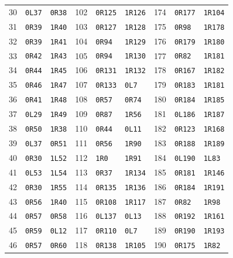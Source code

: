 \begin{longtable}{@{}rll@{\hspace{1.4em}}rll@{\hspace{1.4em}}rll@{}}
30 & \texttt{0L37} & \texttt{0R38} & 102 & \texttt{0R125} & \texttt{1R126} & 174 & \texttt{0R177} & \texttt{1R104} \\
31 & \texttt{0R39} & \texttt{1R40} & 103 & \texttt{0R127} & \texttt{1R128} & 175 & \texttt{0R98} & \texttt{1R178} \\
32 & \texttt{0R39} & \texttt{1R41} & 104 & \texttt{0R94} & \texttt{1R129} & 176 & \texttt{0R179} & \texttt{1R180} \\
33 & \texttt{0R42} & \texttt{1R43} & 105 & \texttt{0R94} & \texttt{1R130} & 177 & \texttt{0R82} & \texttt{1R181} \\
34 & \texttt{0R44} & \texttt{1R45} & 106 & \texttt{0R131} & \texttt{1R132} & 178 & \texttt{0R167} & \texttt{1R182} \\
35 & \texttt{0R46} & \texttt{1R47} & 107 & \texttt{0R133} & \texttt{0L7} & 179 & \texttt{0R183} & \texttt{1R181} \\
36 & \texttt{0R41} & \texttt{1R48} & 108 & \texttt{0R57} & \texttt{0R74} & 180 & \texttt{0R184} & \texttt{1R185} \\
37 & \texttt{0L29} & \texttt{1R49} & 109 & \texttt{0R87} & \texttt{1R56} & 181 & \texttt{0L186} & \texttt{1R187} \\
38 & \texttt{0R50} & \texttt{1R38} & 110 & \texttt{0R44} & \texttt{0L11} & 182 & \texttt{0R123} & \texttt{1R168} \\
39 & \texttt{0L37} & \texttt{0R51} & 111 & \texttt{0R56} & \texttt{1R90} & 183 & \texttt{0R188} & \texttt{1R189} \\
40 & \texttt{0R30} & \texttt{1L52} & 112 & \texttt{1R0} & \texttt{1R91} & 184 & \texttt{0L190} & \texttt{1L83} \\
41 & \texttt{0L53} & \texttt{1L54} & 113 & \texttt{0R37} & \texttt{1R134} & 185 & \texttt{0R181} & \texttt{1R146} \\
42 & \texttt{0R30} & \texttt{1R55} & 114 & \texttt{0R135} & \texttt{1R136} & 186 & \texttt{0R184} & \texttt{1R191} \\
43 & \texttt{0R56} & \texttt{1R40} & 115 & \texttt{0R108} & \texttt{1R117} & 187 & \texttt{0R82} & \texttt{1R98} \\
44 & \texttt{0R57} & \texttt{0R58} & 116 & \texttt{0L137} & \texttt{0L13} & 188 & \texttt{0R192} & \texttt{1R161} \\
45 & \texttt{0R59} & \texttt{0L12} & 117 & \texttt{0R110} & \texttt{0L7} & 189 & \texttt{0R190} & \texttt{1R193} \\
46 & \texttt{0R57} & \texttt{0R60} & 118 & \texttt{0R138} & \texttt{1R105} & 190 & \texttt{0R175} & \texttt{1R82} \\

\end{longtable}
